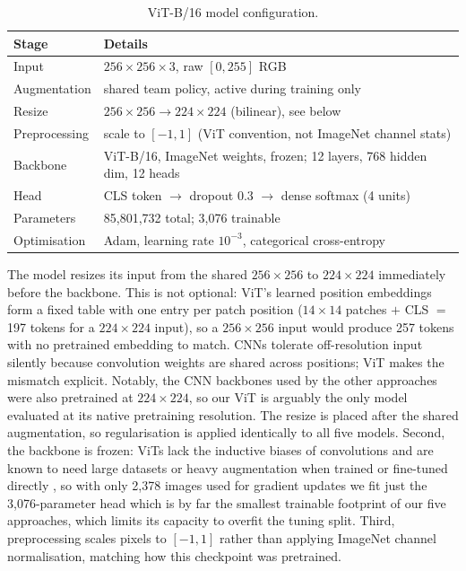 \documentclass[11pt,twoside,a4paper]{article}
\begin{document}
\begin{table}[H]
\centering
\caption{ViT-B/16 model configuration.}
\label{tab:vit-config}
\small
\begin{tabular}{ll}
\toprule
Stage & Details \\
\midrule
Input & $256\times256\times3$, raw $[0,255]$ RGB \\
Augmentation & shared team policy, active during training only \\
Resize & $256\times256 \rightarrow 224\times224$ (bilinear), see below \\
Preprocessing & scale to $[-1,1]$ (ViT convention, not ImageNet channel stats) \\
Backbone & ViT-B/16, ImageNet weights, frozen; 12 layers, 768 hidden dim, 12 heads \\
Head & CLS token $\rightarrow$ dropout 0.3 $\rightarrow$ dense softmax (4 units) \\
Parameters & 85{,}801{,}732 total; 3{,}076 trainable \\
Optimisation & Adam, learning rate $10^{-3}$, categorical cross-entropy \\
\bottomrule
\end{tabular}
\end{table}

The model resizes its input from the shared $256\times256$ to $224\times224$ immediately before the backbone. 
This is not optional: ViT's learned position embeddings form
a fixed table with one entry per patch position ($14\times14$ patches
$+$ CLS $=$ 197 tokens for a $224\times224$ input), so a $256\times256$
input would produce 257 tokens with no pretrained embedding to match. CNNs
tolerate off-resolution input silently because convolution weights are
shared across positions; ViT makes the mismatch explicit. Notably, the CNN
backbones used by the other approaches were also pretrained at
$224\times224$, so our ViT is arguably the only model evaluated at its
native pretraining resolution. The resize is placed after the shared
augmentation, so regularisation is applied identically to all five models.
Second, the backbone is frozen: ViTs lack the inductive biases of
convolutions and are known to need large datasets or heavy augmentation
when trained or fine-tuned directly \cite{Dosovitskiy2021,Touvron2021}, so
with only 2{,}378 images used for gradient updates we fit just the 3{,}076-parameter head which is by far the smallest trainable footprint of our five approaches, which
limits its capacity to overfit the tuning split. Third, preprocessing scales
pixels to $[-1,1]$ rather than applying ImageNet channel normalisation,
matching how this checkpoint was pretrained.
\end{document}
